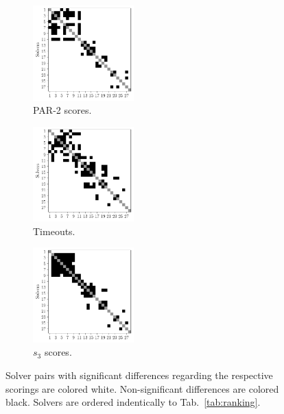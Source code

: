 \documentclass[runningheads]{llncs}
\begin{document}
\begin{figure}[tbp]
  \centering
  \begin{subfigure}{0.32\textwidth}
    \centering
    \includegraphics[width=3.9cm]{../plots/par2sigdiff.pdf}
    \caption{PAR-2 scores.}
  \end{subfigure}
  \begin{subfigure}{0.32\textwidth}
    \centering
    \includegraphics[width=3.9cm]{../plots/timeoutsigdiff.pdf}
    \caption{Timeouts.}
  \end{subfigure}
  \begin{subfigure}{0.32\textwidth}
    \centering
    \includegraphics[width=3.9cm]{../plots/s3sigdiff.pdf}
    \caption{$s_3$ scores.}
  \end{subfigure}
  \caption{Solver pairs with significant differences regarding the respective scorings are colored white. Non-significant differences are colored black. Solvers are ordered indentically to Tab.~\ref{tab:ranking}.}
\end{figure}

\end{document}
